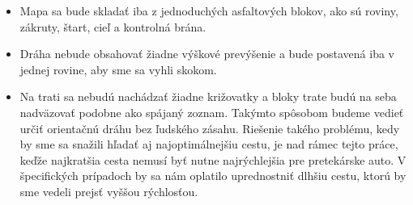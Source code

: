 \begin{itemize}
    \item {
        Mapa sa bude skladať iba z jednoduchých asfaltových blokov, ako sú roviny, zákruty, štart, cieľ a kontrolná brána. 
    }
    \item {
        Dráha nebude obsahovať žiadne výškové prevýšenie a bude postavená iba v jednej rovine, aby sme sa vyhli skokom.
    }

    \item {
        Na trati sa nebudú nachádzať žiadne križovatky a bloky trate budú na seba nadväzovať podobne ako spájaný zoznam. Takýmto spôsobom budeme vedieť určiť orientačnú dráhu bez ľudského zásahu. Riešenie takého problému, kedy by sme sa snažili hľadať aj najoptimálnejšiu cestu, je nad rámec tejto práce, keďže najkratšia cesta nemusí byť nutne najrýchlejšia pre pretekárske auto. V špecifických prípadoch by sa nám oplatilo uprednostniť dlhšiu cestu, ktorú by sme vedeli prejsť vyššou rýchlosťou.
    }
\end{itemize}








